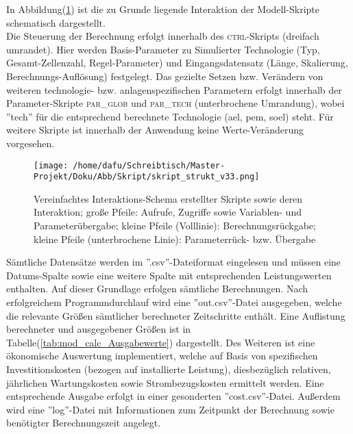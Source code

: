 \documentclass[onecolumn,10pt,titlepage]{article}
\begin{document}
In Abbildung(\ref{fig:Strukt_Skript}) ist die zu Grunde liegende Interaktion der Modell-Skripte schematisch dargestellt.\\
Die Steuerung der Berechnung erfolgt innerhalb des \textsc{ctrl}-Skripts (dreifach umrandet). Hier werden Basis-Parameter zu Simulierter Technologie (Typ, Gesamt-Zellenzahl, Regel-Parameter) und Eingangsdatensatz (Länge, Skalierung, Berechnungs-Auflösung) festgelegt.
 Das gezielte Setzen bzw. Verändern von weiteren technologie- bzw. anlagenspezifischen Parametern erfolgt innerhalb der Parameter-Skripte \textsc{par\_glob} und \textsc{par\_tech} (unterbrochene Umrandung), wobei ''tech'' für die entsprechend berechnete Technologie (\gls{ael}, \gls{pem}, \gls{soel}) steht. Für weitere Skripte ist innerhalb der Anwendung keine Werte-Veränderung vorgesehen.\\
\begin{figure}[H]

	\centering
	\texttt{[image: /home/dafu/Schreibtisch/Master-Projekt/Doku/Abb/Skript/skript\_strukt\_v33.png]}
	\caption[Skript-Interaktions-Schema]{Vereinfachtes Interaktions-Schema erstellter Skripte sowie deren Interaktion; große Pfeile: Aufrufe, Zugriffe sowie Variablen- und Parameterübergabe; kleine Pfeile (Volllinie): Berechnungsrückgabe; kleine Pfeile (unterbrochene Linie): Parameterrück- bzw. Übergabe}
	\label{fig:Strukt_Skript}
\end{figure}

Sämtliche Datensätze werden im ''.csv''-Dateiformat eingelesen und müssen eine Datums-Spalte sowie eine weitere Spalte mit entsprechenden Leistungswerten enthalten. Auf dieser Grundlage erfolgen sämtliche Berechnungen. Nach erfolgreichem Programmdurchlauf wird eine ''out.csv''-Datei ausgegeben, welche die relevante Größen sämtlicher berechneter Zeitschritte enthält. Eine Auflistung berechneter und ausgegebener Größen ist in Tabelle(\ref{tab:mod_calc_Ausgabewerte}) dargestellt. Des Weiteren ist eine ökonomische Auswertung implementiert, welche auf Basis von spezifischen Investitionskosten (bezogen auf installierte Leistung), diesbezüglich relativen, jährlichen Wartungskosten sowie Strombezugskosten ermittelt werden. Eine entsprechende Ausgabe erfolgt in einer gesonderten ''cost.csv''-Datei. Außerdem wird eine ''log''-Datei mit Informationen zum Zeitpunkt der Berechnung sowie benötigter Berechnungszeit angelegt.
\end{document}

